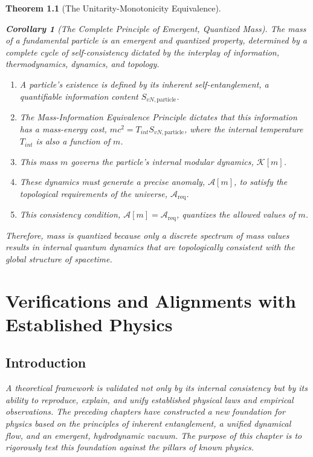 \documentclass[11pt, letterpaper]{report}
\theoremstyle{plain} %
\newtheorem{theorem}{Theorem}[chapter]
\newtheorem{corollary}[theorem]{Corollary}
\theoremstyle{definition} %
\theoremstyle{remark} %
\newcommand{\ModularK}{\mathcal{K}}
\begin{document}
\begin{theorem}[The Unitarity-Monotonicity Equivalence]
\begin{corollary}[The Complete Principle of Emergent, Quantized Mass]
\label{cor:final_synthesis_of_chapter}
The mass of a fundamental particle is an emergent and quantized property, determined by a complete cycle of self-consistency dictated by the interplay of information, thermodynamics, dynamics, and topology.
\begin{enumerate}
    \item A particle's existence is defined by its inherent self-entanglement, a quantifiable information content $S_{vN, \text{particle}}$.
    \item The Mass-Information Equivalence Principle dictates that this information has a mass-energy cost, $m c^2 = T_{int} S_{vN, \text{particle}}$, where the internal temperature $T_{int}$ is also a function of $m$.
    \item This mass $m$ governs the particle's internal modular dynamics, $\ModularK[m]$.
    \item These dynamics must generate a precise anomaly, $\mathcal{A}[m]$, to satisfy the topological requirements of the universe, $\mathcal{A}_{\text{req}}$.
    \item This consistency condition, $\mathcal{A}[m] = \mathcal{A}_{\text{req}}$, quantizes the allowed values of $m$.
\end{enumerate}
Therefore, mass is quantized because only a discrete spectrum of mass values results in internal quantum dynamics that are topologically consistent with the global structure of spacetime.
\end{corollary}





\chapter{Verifications and Alignments with Established Physics}
\label{chap:verifications}

\section{Introduction}

A theoretical framework is validated not only by its internal consistency but by its ability to reproduce, explain, and unify established physical laws and empirical observations. The preceding chapters have constructed a new foundation for physics based on the principles of inherent entanglement, a unified dynamical flow, and an emergent, hydrodynamic vacuum. The purpose of this chapter is to rigorously test this foundation against the pillars of known physics.


\end{theorem}
\end{document}
